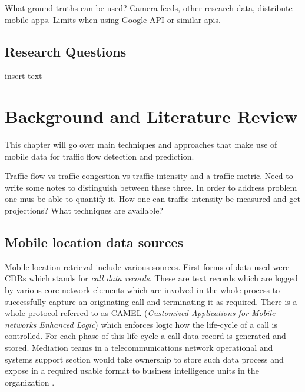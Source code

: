 \documentclass[12pt, a4paper]{report}
\theoremstyle{definition}
\theoremstyle{definition}%
\theoremstyle{definition}%
\theoremstyle{definition}%
\theoremstyle{definition}%
\theoremstyle{definition}%
\begin{document}
What ground truths can be used? Camera feeds, other research data, distribute mobile apps.
Limits when using Google API or similar apis.

\section{Research Questions}
insert text




\chapter{Background and Literature Review} \label{background}


This chapter will go over main techniques and approaches that make use of mobile data for traffic flow detection and prediction.

Traffic flow vs traffic congestion vs traffic intensity and a traffic metric.
Need to write some notes to distinguish between these three.
In order to address problem one mus be able to quantify it. How one can traffic intensity be measured and get projections? What techniques are available?

\section{Mobile location data sources} \label{background_mobile_location_data_sources} 

Mobile location retrieval include various sources. First forms of data used were CDRs which stands for \textit{call data records}. These are text records which are logged by various core network elements which are involved in the whole process to successfully capture an originating call and terminating it as required. There is a whole protocol referred to as CAMEL (\textit{Customized Applications for Mobile networks Enhanced Logic}) which enforces logic how the life-cycle of a call is controlled. For each phase of this life-cycle a call data record is generated and stored. Mediation teams in a telecommunications network operational and systems support section would take ownership to store such data process and expose in a required usable format to business intelligence units in the organization \cite{Liu2014}.
\end{document}
